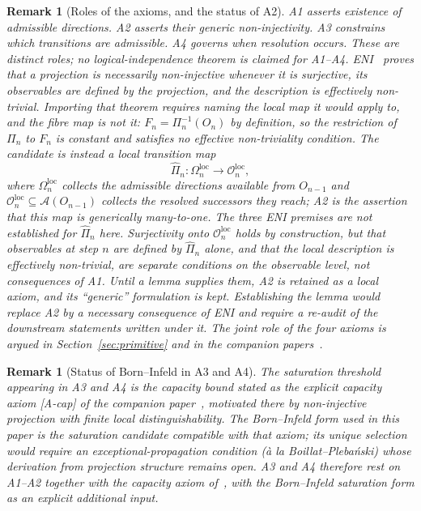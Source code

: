 \documentclass[11pt,a4paper]{article}
\newtheorem{remark}[theorem]{Remark}
\begin{document}
  \begin{remark}[Roles of the axioms, and the status of A2]
  \label{rem:a2-status}
  A1 asserts existence of admissible directions.
  A2 asserts their generic non-injectivity.
  A3 constrains which transitions are admissible.
  A4 governs when resolution occurs.
  These are distinct roles; no logical-independence theorem is claimed for A1--A4.
  ENI~\cite{Beau2026l} proves that a projection is necessarily non-injective whenever it is surjective, its
  observables are defined by the projection, and the description is effectively non-trivial.
  Importing that theorem requires naming the local map it would apply to, and the fibre map is not it:
  $F_n = \Pi_n^{-1}(O_n)$ by definition, so the restriction of $\Pi_n$ to $F_n$ is constant and satisfies no
  effective non-triviality condition.
  The candidate is instead a local transition map
  \[
    \widehat{\Pi}_n \colon \Omega_n^{\mathrm{loc}} \longrightarrow \mathcal{O}_n^{\mathrm{loc}},
  \]
  where $\Omega_n^{\mathrm{loc}}$ collects the admissible directions available from $O_{n-1}$ and
  $\mathcal{O}_n^{\mathrm{loc}} \subseteq \mathcal{A}(O_{n-1})$ collects the resolved successors they reach;
  A2 is the assertion that this map is generically many-to-one.
  The three ENI premises are not established for $\widehat{\Pi}_n$ here.
  Surjectivity onto $\mathcal{O}_n^{\mathrm{loc}}$ holds by construction, but that observables at step $n$ are
  defined by $\widehat{\Pi}_n$ alone, and that the local description is effectively non-trivial, are separate
  conditions on the observable level, not consequences of A1.
  Until a lemma supplies them, A2 is retained as a local axiom, and its ``generic'' formulation is kept.
  Establishing the lemma would replace A2 by a necessary consequence of ENI and require a re-audit of the
  downstream statements written under it.
  The joint role of the four axioms is argued in Section~\ref{sec:primitive} and in the
  companion papers~\cite{Beau2026l,Beau2026c}.
  \end{remark}

  \begin{remark}[Status of Born--Infeld in A3 and A4]
  The saturation threshold appearing in A3 and A4 is the capacity bound stated as
  the explicit capacity axiom [A-cap] of the companion paper~\cite{Beau2026c},
  motivated there by non-injective projection with finite local distinguishability.
  The Born--Infeld form used in this paper is the saturation candidate compatible
  with that axiom; its unique selection would require an exceptional-propagation
  condition (\`a la Boillat--Pleba\'nski) whose derivation from projection
  structure remains open.
  A3 and A4 therefore rest on A1--A2 together with the capacity axiom
  of~\cite{Beau2026c}, with the Born--Infeld saturation form as an explicit
  additional input.
  \end{remark}
\end{document}
